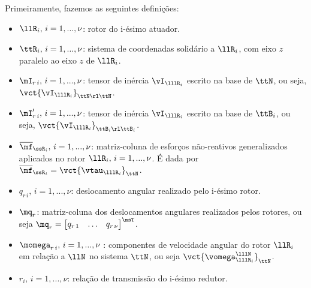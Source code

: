 \documentclass[]{politex}
\begin{document}
Primeiramente, fazemos as seguintes definições:
\begin{itemize}
\item $\llR_i, \,i=1,...,\nu$: rotor do i-ésimo atuador.
\item $\ttR_i, \,i=1,...,\nu$: sistema de coordenadas solidário a $\llR_i$, com eixo $z$ paralelo ao eixo $z$ de $\llR_i$.
\item $\mI_{r \,i}, \,i=1,...,\nu$: tensor de in\'ercia $\vI_{\lllR_i}$ escrito na base de $\ttN$, ou seja, $\vct{\vI_{\lllR_i}}_{\ttN \rl \ttN}$.
\item $\mI'_{r \,i}, \,i=1,...,\nu$: tensor de in\'ercia $\vI_{\lllR_i}$ escrito na base de $\ttB_i$, ou seja, $\vct{\vI_{\lllR_i}}_{\ttB_i \rl \ttB_i}$.
\item $\overline{\mf}_{\ssR_i}, \,i=1,...,\nu$: matriz-coluna de esforços não-reativos generalizados aplicados no rotor $\llR_{i}, \,i=1,...,\nu$. É dada por $\overline{\mf}_{\ssR_i} = \vct{\vtau_{\lllR_i}}_\ttN $.
\item $q_{r\,i}, \,i=1,...,\nu$: deslocamento angular realizado pelo i-ésimo rotor.
\item $\mq_r$: matriz-coluna dos deslocamentos angulares realizados pelos rotores, ou seja $\mq_r = \begin{bmatrix} q_{r\,1} & \hdots & q_{r\,\nu}  \end{bmatrix}^\msT$.
\item $\momega_{r \,i}, \,i=1,...,\nu$ : componentes de velocidade angular do rotor $\llR_i$ em relação a $\llN$ no sistema $\ttN$, ou seja $\vct{\vomega_{\lllR_i}^{\lllN} }_{\ttN} $.
\item $r_i, \,i=1,...,\nu$: relação de transmissão do i-ésimo redutor.

\end{itemize}
\end{document}
